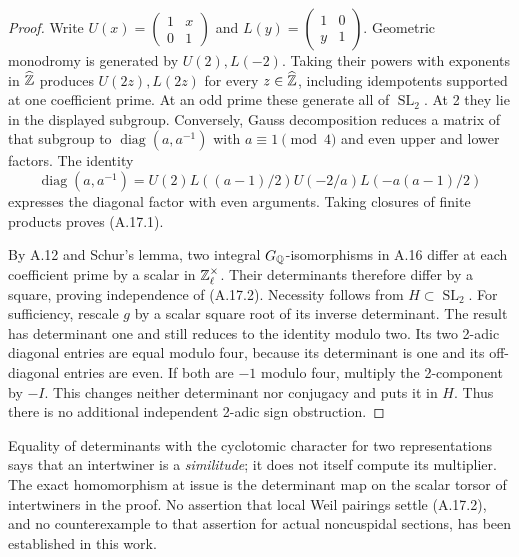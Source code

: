 \begin{proof}
Write $U(x)=\left(\begin{smallmatrix}1&x\\0&1\end{smallmatrix}\right)$
and $L(y)=\left(\begin{smallmatrix}1&0\\y&1\end{smallmatrix}\right)$.
Geometric monodromy is generated by $U(2),L(-2)$.  Taking their powers
with exponents in $\widehat{\mathbb Z}$ produces $U(2z),L(2z)$ for every
$z\in\widehat{\mathbb Z}$, including idempotents supported at one coefficient
prime.  At an odd prime these generate all of $\operatorname{SL}_2$.
At 2 they lie in the displayed subgroup.  Conversely, Gauss
decomposition reduces a matrix of that subgroup to
$\operatorname{diag}(a,a^{-1})$ with $a\equiv1\pmod4$ and even
upper and lower factors.  The identity
\[
 \operatorname{diag}(a,a^{-1})=
 U(2)L((a-1)/2)U(-2/a)L(-a(a-1)/2)
\]
expresses the diagonal factor with even arguments.  Taking closures
of finite products proves (A.17.1).

By A.12 and Schur's lemma, two integral $G_\mathbb Q$-isomorphisms in A.16
differ at each coefficient prime by a scalar in $\mathbb Z_\ell^\times$.
Their determinants therefore differ by a square, proving independence
of (A.17.2).  Necessity follows from $H\subset\operatorname{SL}_2$.
For sufficiency, rescale $g$ by a scalar square root of its inverse
determinant.  The result has determinant one and still reduces to the
identity modulo two.  Its two 2-adic diagonal entries are equal modulo
four, because its determinant is one and its off-diagonal entries are
even.  If both are $-1$ modulo four, multiply the 2-component by $-I$.
This changes neither determinant nor conjugacy and puts it in $H$.
Thus there is no additional independent 2-adic sign obstruction.
\end{proof}
Equality of determinants with the cyclotomic character for two
representations says that an intertwiner is a \emph{similitude}; it
does not itself compute its multiplier.  The exact homomorphism at
issue is the determinant map on the scalar torsor of intertwiners in
the proof.  No assertion that local Weil pairings settle (A.17.2), and
no counterexample to that assertion for actual noncuspidal sections,
has been established in this work.

